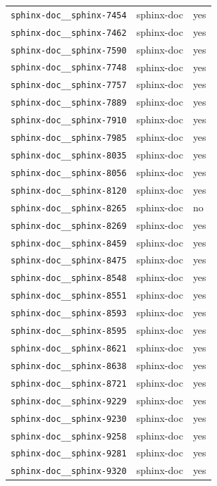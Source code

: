 \begin{longtable}{@{}p{}lp{}@{}}
\texttt{sphinx-doc\_\_sphinx-7454} & sphinx-doc & yes \\
\texttt{sphinx-doc\_\_sphinx-7462} & sphinx-doc & yes \\
\texttt{sphinx-doc\_\_sphinx-7590} & sphinx-doc & yes \\
\texttt{sphinx-doc\_\_sphinx-7748} & sphinx-doc & yes \\
\texttt{sphinx-doc\_\_sphinx-7757} & sphinx-doc & yes \\
\texttt{sphinx-doc\_\_sphinx-7889} & sphinx-doc & yes \\
\texttt{sphinx-doc\_\_sphinx-7910} & sphinx-doc & yes \\
\texttt{sphinx-doc\_\_sphinx-7985} & sphinx-doc & yes \\
\texttt{sphinx-doc\_\_sphinx-8035} & sphinx-doc & yes \\
\texttt{sphinx-doc\_\_sphinx-8056} & sphinx-doc & yes \\
\texttt{sphinx-doc\_\_sphinx-8120} & sphinx-doc & yes \\
\texttt{sphinx-doc\_\_sphinx-8265} & sphinx-doc & no \\
\texttt{sphinx-doc\_\_sphinx-8269} & sphinx-doc & yes \\
\texttt{sphinx-doc\_\_sphinx-8459} & sphinx-doc & yes \\
\texttt{sphinx-doc\_\_sphinx-8475} & sphinx-doc & yes \\
\texttt{sphinx-doc\_\_sphinx-8548} & sphinx-doc & yes \\
\texttt{sphinx-doc\_\_sphinx-8551} & sphinx-doc & yes \\
\texttt{sphinx-doc\_\_sphinx-8593} & sphinx-doc & yes \\
\texttt{sphinx-doc\_\_sphinx-8595} & sphinx-doc & yes \\
\texttt{sphinx-doc\_\_sphinx-8621} & sphinx-doc & yes \\
\texttt{sphinx-doc\_\_sphinx-8638} & sphinx-doc & yes \\
\texttt{sphinx-doc\_\_sphinx-8721} & sphinx-doc & yes \\
\texttt{sphinx-doc\_\_sphinx-9229} & sphinx-doc & yes \\
\texttt{sphinx-doc\_\_sphinx-9230} & sphinx-doc & yes \\
\texttt{sphinx-doc\_\_sphinx-9258} & sphinx-doc & yes \\
\texttt{sphinx-doc\_\_sphinx-9281} & sphinx-doc & yes \\
\texttt{sphinx-doc\_\_sphinx-9320} & sphinx-doc & yes \\

\end{longtable}
